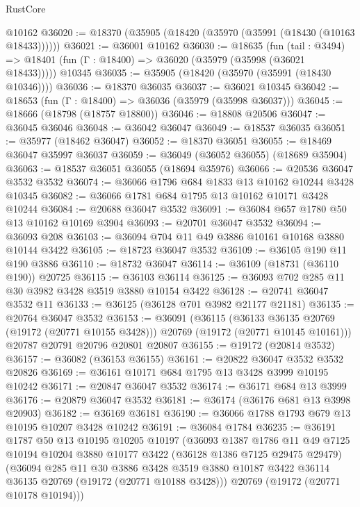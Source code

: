 \begin{lexlean}{RustCore}
\begin{coremodule}
    @10162
@36020 := @18370 (@35905 (@18420 (@35970 (@35991 (@18430 (@10163 @18433))))))
@36021 := @36001 @10162
@36030 := @18635
    (fun (tail : @3494) => @18401 (fun (Γ : @18400) => @36020 (@35979 (@35998 (@36021 @18433)))))
    @10345
@36035 := @35905 (@18420 (@35970 (@35991 (@18430 @10346))))
@36036 := @18370 @36035
@36037 := @36021 @10345
@36042 := @18653 (fun (Γ : @18400) => @36036 (@35979 (@35998 @36037)))
@36045 := @18666 (@18798 (@18757 @18800))
@36046 := @18808 @20506
@36047 := @36045 @36046
@36048 := @36042 @36047
@36049 := @18537 @36035
@36051 := @35977 (@18462 @36047)
@36052 := @18370 @36051
@36055 := @18469 @36047 @35997 @36037
@36059 := @36049 (@36052 @36055) (@18689 @35904)
@36063 := @18537 @36051 @36055 (@18694 @35976)
@36066 := @20536 @36047 @3532 @3532
@36074 := @36066 @1796 @684 @1833 @13 @10162 @10244 @3428 @10345
@36082 := @36066 @1781 @684 @1795 @13 @10162 @10171 @3428 @10244
@36084 := @20688 @36047 @3532
@36091 := @36084 @657 @1780 @50 @13 @10162 @10169 @3904
@36093 := @20701 @36047 @3532
@36094 := @36093 @208
@36103 := @36094 @704 @11 @49 @3886 @10161 @10168 @3880 @10144 @3422
@36105 := @18723 @36047 @3532
@36109 := @36105 @190 @11 @190 @3886
@36110 := @18732 @36047
@36114 := @36109 (@18731 (@36110 @190)) @20725
@36115 := @36103 @36114
@36125 := @36093 @702 @285 @11 @30 @3982 @3428 @3519 @3880 @10154 @3422
@36128 := @20741 @36047 @3532 @11
@36133 := @36125 (@36128 @701 @3982 @21177 @21181)
@36135 := @20764 @36047 @3532
@36153 := @36091
    (@36115
      (@36133 @36135 @20769 (@19172 (@20771 @10155 @3428)))
      @20769
      (@19172 (@20771 @10145 @10161)))
    @20787
    @20791
    @20796
    @20801
    @20807
@36155 := @19172 (@20814 @3532)
@36157 := @36082 (@36153 @36155)
@36161 := @20822 @36047 @3532 @3532 @20826
@36169 := @36161 @10171 @684 @1795 @13 @3428 @3999 @10195 @10242
@36171 := @20847 @36047 @3532
@36174 := @36171 @684 @13 @3999
@36176 := @20879 @36047 @3532
@36181 := @36174 (@36176 @681 @13 @3998 @20903)
@36182 := @36169 @36181
@36190 := @36066 @1788 @1793 @679 @13 @10195 @10207 @3428 @10242
@36191 := @36084 @1784
@36235 := @36191
    @1787
    @50
    @13
    @10195
    @10205
    @10197
    (@36093
      @1387
      @1786
      @11
      @49
      @7125
      @10194
      @10204
      @3880
      @10177
      @3422
      (@36128 @1386 @7125 @29475 @29479)
      (@36094
        @285
        @11
        @30
        @3886
        @3428
        @3519
        @3880
        @10187
        @3422
        @36114
        @36135
        @20769
        (@19172 (@20771 @10188 @3428)))
      @20769
      (@19172 (@20771 @10178 @10194)))

\end{coremodule}
\end{lexlean}

